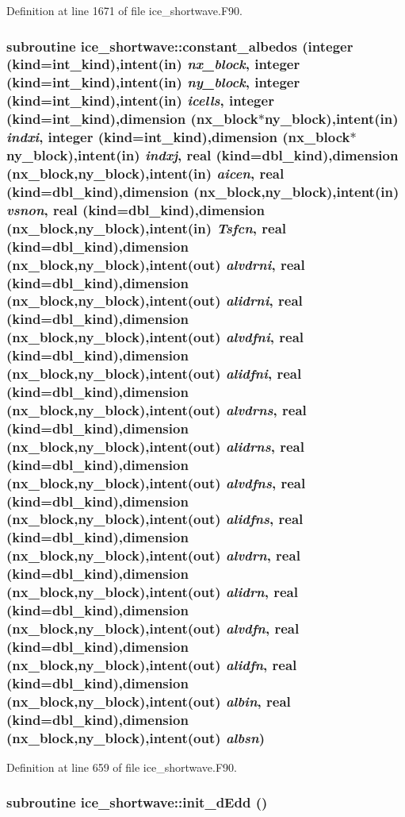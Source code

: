 Definition at line 1671 of file ice\_\-shortwave.F90.\hypertarget{namespaceice__shortwave_a09ea7e76b2fb504e04e9b85aa63f2ac8}{
\subsubsection[{constant\_\-albedos}]{\setlength{\rightskip}{0pt plus 5cm}subroutine ice\_\-shortwave::constant\_\-albedos (integer (kind=int\_\-kind),intent(in) {\em nx\_\-block}, \/  integer (kind=int\_\-kind),intent(in) {\em ny\_\-block}, \/  integer (kind=int\_\-kind),intent(in) {\em icells}, \/  integer (kind=int\_\-kind),dimension (nx\_\-block$\ast$ny\_\-block),intent(in) {\em indxi}, \/  integer (kind=int\_\-kind),dimension (nx\_\-block$\ast$ny\_\-block),intent(in) {\em indxj}, \/  real (kind=dbl\_\-kind),dimension (nx\_\-block,ny\_\-block),intent(in) {\em aicen}, \/  real (kind=dbl\_\-kind),dimension (nx\_\-block,ny\_\-block),intent(in) {\em vsnon}, \/  real (kind=dbl\_\-kind),dimension (nx\_\-block,ny\_\-block),intent(in) {\em Tsfcn}, \/  real (kind=dbl\_\-kind),dimension (nx\_\-block,ny\_\-block),intent(out) {\em alvdrni}, \/  real (kind=dbl\_\-kind),dimension (nx\_\-block,ny\_\-block),intent(out) {\em alidrni}, \/  real (kind=dbl\_\-kind),dimension (nx\_\-block,ny\_\-block),intent(out) {\em alvdfni}, \/  real (kind=dbl\_\-kind),dimension (nx\_\-block,ny\_\-block),intent(out) {\em alidfni}, \/  real (kind=dbl\_\-kind),dimension (nx\_\-block,ny\_\-block),intent(out) {\em alvdrns}, \/  real (kind=dbl\_\-kind),dimension (nx\_\-block,ny\_\-block),intent(out) {\em alidrns}, \/  real (kind=dbl\_\-kind),dimension (nx\_\-block,ny\_\-block),intent(out) {\em alvdfns}, \/  real (kind=dbl\_\-kind),dimension (nx\_\-block,ny\_\-block),intent(out) {\em alidfns}, \/  real (kind=dbl\_\-kind),dimension (nx\_\-block,ny\_\-block),intent(out) {\em alvdrn}, \/  real (kind=dbl\_\-kind),dimension (nx\_\-block,ny\_\-block),intent(out) {\em alidrn}, \/  real (kind=dbl\_\-kind),dimension (nx\_\-block,ny\_\-block),intent(out) {\em alvdfn}, \/  real (kind=dbl\_\-kind),dimension (nx\_\-block,ny\_\-block),intent(out) {\em alidfn}, \/  real (kind=dbl\_\-kind),dimension (nx\_\-block,ny\_\-block),intent(out) {\em albin}, \/  real (kind=dbl\_\-kind),dimension (nx\_\-block,ny\_\-block),intent(out) {\em albsn})}}
\label{namespaceice__shortwave_a09ea7e76b2fb504e04e9b85aa63f2ac8}


Definition at line 659 of file ice\_\-shortwave.F90.\hypertarget{namespaceice__shortwave_ad9abb419b6673b90f9885b9f70a715ac}{
\subsubsection[{init\_\-dEdd}]{\setlength{\rightskip}{0pt plus 5cm}subroutine ice\_\-shortwave::init\_\-dEdd ()}}
\label{namespaceice__shortwave_ad9abb419b6673b90f9885b9f70a715ac}


